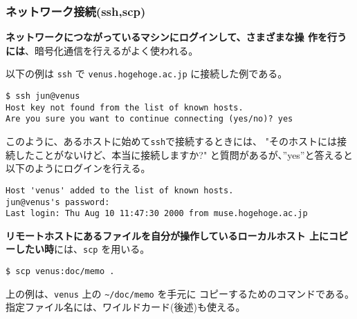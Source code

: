 \documentclass{jreport}
\begin{document}
\subsubsection{ネットワーク接続(ssh,scp)}
\label{sec:ssh}

\textbf{ネットワークにつながっているマシンにログインして、さまざまな操
  作を行うには}、暗号化通信を行えるがよく使われる。

以下の例は \verb|ssh| で \verb|venus.hogehoge.ac.jp| に接続した例である。
\begin{screen}
\begin{verbatim}
$ ssh jun@venus
Host key not found from the list of known hosts.
Are you sure you want to continue connecting (yes/no)? yes
\end{verbatim}
\end{screen}
このように、あるホストに始めて\verb|ssh|で接続するときには、
"そのホストには接続したことがないけど、本当に接続しますか?"
と質問があるが、''yes''と答えると以下のようにログインを行える。
\begin{screen}
\begin{verbatim}
Host 'venus' added to the list of known hosts.
jun@venus's password: 
Last login: Thu Aug 10 11:47:30 2000 from muse.hogehoge.ac.jp
\end{verbatim}
\end{screen}

\textbf{リモートホストにあるファイルを自分が操作しているローカルホスト
  上にコピーしたい時}には、\verb|scp| を用いる。
\begin{screen}
\begin{verbatim}
$ scp venus:doc/memo .
\end{verbatim}
\end{screen}
上の例は、\verb|venus| 上の \verb|~/doc/memo| を手元に
コピーするためのコマンドである。指定ファイル名には、ワイルドカード(後述)も使える。
\end{document}
